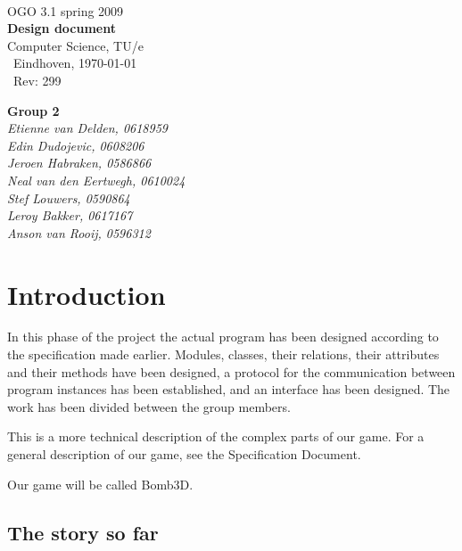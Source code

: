 \documentclass[a4paper,twoside,11pt]{article}
\begin{document}
   \begin{titlepage}
        {\ }\\[5.0cm]
        { {\Large OGO 3.1 spring 2009}}\\[0.2cm]
        {\bf \Huge Design document}\\[0.1cm]
        { {\Large {Computer Science, TU/e} }}\\[1.0cm]
        {\ Eindhoven, \today }\\[0.2cm]
		  {\ $ $Rev: 299 $ $ }\\[0.2cm]
        \begin{flushright}
            {\bf {\small Group 2 }}\\[0.0cm]
            {\em {\small Etienne van Delden, 0618959}}\\
            {\em {\small Edin Dudojevic, 0608206}}\\
            {\em {\small Jeroen Habraken, 0586866}}\\
            {\em {\small Neal van den Eertwegh, 0610024 }}\\
            {\em {\small Stef Louwers, 0590864}}\\
            {\em {\small Leroy Bakker, 0617167}}\\
            {\em {\small Anson van Rooij, 0596312}}\\[0.5cm]
        \end{flushright}
    \end{titlepage}
    \tableofcontents
    \newpage


\section{Introduction}

In this phase of the project the actual program has been designed according to the specification made earlier. Modules, classes, their relations, their attributes and their methods have been designed, a protocol for the communication between program instances has been established, and an interface has been designed. The work has been divided between the group members.

This is a more technical description of the complex parts of our game. For a general description of our game, see the Specification Document.

Our game will be called Bomb3D.

  \subsection{The story so far} %
  \label{sub:the_story_so_far}
\end{document}

